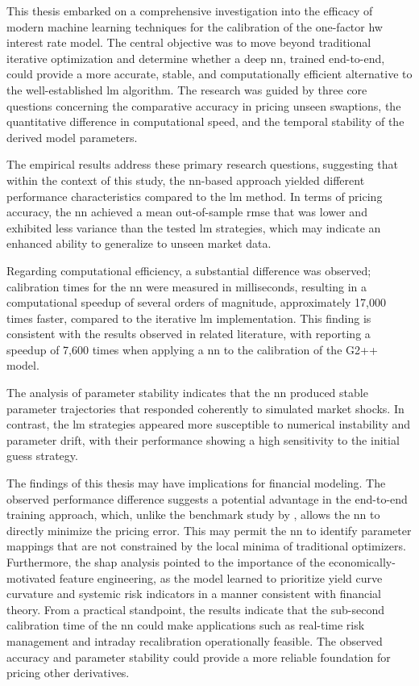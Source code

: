 This thesis embarked on a comprehensive investigation into the efficacy of modern machine learning techniques for the calibration of the one-factor \ac{hw} interest rate model. The central objective was to move beyond traditional iterative optimization and determine whether a deep \ac{nn}, trained end-to-end, could provide a more accurate, stable, and computationally efficient alternative to the well-established \ac{lm} algorithm. The research was guided by three core questions concerning the comparative accuracy in pricing unseen swaptions, the quantitative difference in computational speed, and the temporal stability of the derived model parameters.

The empirical results address these primary research questions, suggesting that within the context of this study, the \ac{nn}-based approach yielded different performance characteristics compared to the \ac{lm} method. In terms of pricing accuracy, the \ac{nn} achieved a mean out-of-sample \ac{rmse} that was lower and exhibited less variance than the tested \ac{lm} strategies, which may indicate an enhanced ability to generalize to unseen market data.

Regarding computational efficiency, a substantial difference was observed; calibration times for the \ac{nn} were measured in milliseconds, resulting in a computational speedup of several orders of magnitude, approximately 17,000 times faster, compared to the iterative \ac{lm} implementation. This finding is consistent with the results observed in related literature, with \textcite{alaya2021deep} reporting a speedup of 7,600 times when applying a \ac{nn} to the calibration of the G2++ model.

The analysis of parameter stability indicates that the \ac{nn} produced stable parameter trajectories that responded coherently to simulated market shocks. In contrast, the \ac{lm} strategies appeared more susceptible to numerical instability and parameter drift, with their performance showing a high sensitivity to the initial guess strategy.

The findings of this thesis may have implications for financial modeling. The observed performance difference suggests a potential advantage in the end-to-end training approach, which, unlike the benchmark study by \textcite{hernandez2016model}, allows the \ac{nn} to directly minimize the pricing error. This may permit the \ac{nn} to identify parameter mappings that are not constrained by the local minima of traditional optimizers. Furthermore, the \ac{shap} analysis pointed to the importance of the economically-motivated feature engineering, as the model learned to prioritize yield curve curvature and systemic risk indicators in a manner consistent with financial theory. From a practical standpoint, the results indicate that the sub-second calibration time of the \ac{nn} could make applications such as real-time risk management and intraday recalibration operationally feasible. The observed accuracy and parameter stability could provide a more reliable foundation for pricing other derivatives.

